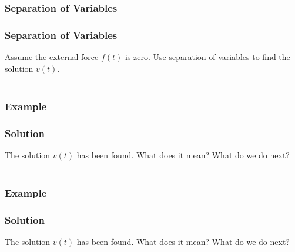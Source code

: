 \documentclass[fleqn]{beamer} %
\newcommand{\sectionIIsubsectionIItitle}{Separation of Variables}
\newcommand{\sectionIIsubsectionIIItitle}{Example}
\begin{document}
			\begin{frame}
				\frametitle{\sectionIIsubsectionIItitle}
				\bigskip

				\frametitle{Separation of Variables}

				Assume the external force $f(t)$ is zero. Use separation of variables to find the solution $v(t)$.  \vspace{5mm}\\

				 \vspace{50mm}\\
				
				\btVFill 
			\end{frame}	


			\begin{frame}
				\frametitle{\sectionIIsubsectionIIItitle}
				\bigskip

				\frametitle{Solution}

				The solution $v(t)$ has been found. What does it mean? What do we do next?\vspace{5mm}\\

				 \vspace{50mm}\\

				\btVFill 
			\end{frame}

			\begin{frame}
				\frametitle{\sectionIIsubsectionIIItitle}
				\bigskip

				\frametitle{Solution}

				The solution $v(t)$ has been found. What does it mean? What do we do next?\vspace{5mm}\\

				 \vspace{50mm}\\

				\btVFill 
			\end{frame}
\end{document}
